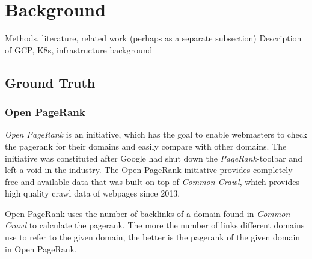 \section{Background}
Methods, literature, related work (perhaps as a separate subsection)
Description of GCP, K8s, infrastructure background

\subsection{Ground Truth}
\subsubsection{Open PageRank}
\label{OpenPageRank}
\textit{Open PageRank} is an initiative, which has the goal to enable webmasters to check the pagerank for their domains and easily compare with other domains. The initiative was constituted after Google had shut down the \textit{PageRank}-toolbar and left a void in the industry. The Open PageRank initiative provides completely free and available data that was built on top of \textit{Common Crawl}, which provides high quality crawl data of webpages since 2013. \cite{OpenPageRank} \cite{CommonCrawl}

Open PageRank uses the number of backlinks of a domain found in \textit{Common Crawl} to calculate the pagerank. The more the number of links different domains use to refer to the given domain, the better is the pagerank of the given domain in Open PageRank.